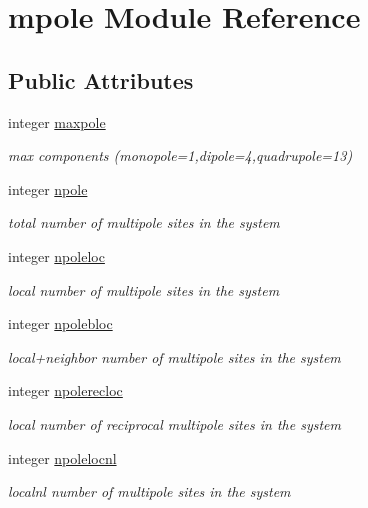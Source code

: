 \hypertarget{classmpole}{\section{mpole Module Reference}
\label{classmpole}
}
\subsection*{Public Attributes}
\begin{DoxyCompactItemize}
\item 
integer \hyperlink{classmpole_ac849d8c6e66420ca0d2e57def5e90d99}{maxpole}
\begin{DoxyCompactList}\small\item\em max components (monopole=1,dipole=4,quadrupole=13) \end{DoxyCompactList}\item 
integer \hyperlink{classmpole_a1fb8ee54aa5e7d374e2ed5115ed2c1fe}{npole}
\begin{DoxyCompactList}\small\item\em total number of multipole sites in the system \end{DoxyCompactList}\item 
integer \hyperlink{classmpole_a72e8bbbeb09748396f126b5c0feceda2}{npoleloc}
\begin{DoxyCompactList}\small\item\em local number of multipole sites in the system \end{DoxyCompactList}\item 
integer \hyperlink{classmpole_ade12dc4b50a1b89aa7b9010a9e553e44}{npolebloc}
\begin{DoxyCompactList}\small\item\em local+neighbor number of multipole sites in the system \end{DoxyCompactList}\item 
integer \hyperlink{classmpole_a3cf245cf7c3576d5360159dbe1d09c44}{npolerecloc}
\begin{DoxyCompactList}\small\item\em local number of reciprocal multipole sites in the system \end{DoxyCompactList}\item 
integer \hyperlink{classmpole_a155cba3d52800902729811ecd85d6980}{npolelocnl}
\begin{DoxyCompactList}\small\item\em localnl number of multipole sites in the system \end{DoxyCompactList}\item 

\end{DoxyCompactItemize}
